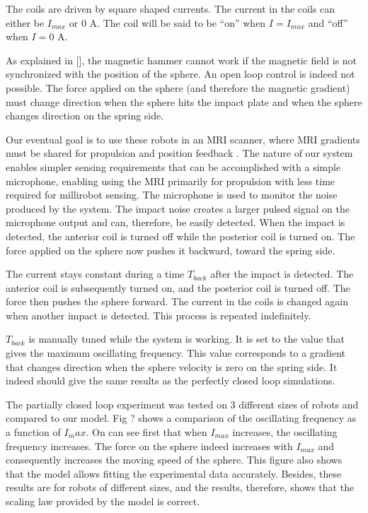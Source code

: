 \documentclass[letterpaper, 10 pt, conference]{ieeeconf}  %
\begin{document}
The coils are driven by square shaped currents. The current in the coils can either be $I_{max}$ or 0 A. The coil will be said to be “on” when $I=I_{max}$ and “off” when $I=0$ A.\par
As explained in [], the magnetic hammer cannot work if the magnetic field is not synchronized with the position of the sphere. An open loop control is indeed not possible. The force applied on the sphere (and therefore the magnetic gradient) must change direction when the sphere hits the impact plate and when the sphere changes direction on the spring side.\par
Our eventual goal is to use these robots in an MRI scanner, where MRI gradients must be shared for propulsion and position feedback \cite{578}. The nature of our system enables simpler sensing requirements that can be accomplished with a simple microphone, enabling using the MRI primarily for propulsion with less time required for millirobot sensing. The microphone is used to monitor the noise produced by the system. The impact noise creates a larger pulsed signal on the microphone output and can, therefore, be easily detected. When the impact is detected, the anterior coil is turned off while the posterior coil is turned on. The force applied on the sphere now pushes it backward, toward the spring side.\par
The current stays constant during a time $T_{back}$ after the impact is detected. The anterior coil is subsequently turned on, and the posterior coil is turned off. The force then pushes the sphere forward. The current in the coils is changed again when another impact is detected. This process is repeated indefinitely.\par
$T_{back}$ is manually tuned while the system is working. It is set to the value that gives the maximum oscillating frequency. This value corresponds to a gradient that changes direction when the sphere velocity is zero on the spring side. It indeed should give the same results as the perfectly closed loop simulations.\par
The partially closed loop experiment was tested on 3 different sizes of robots and compared to our model. Fig ? shows a comparison of the oscillating frequency as a function of $I_max$. On can see first that when $I_{max}$ increases, the oscillating frequency increases. The force on the sphere indeed increases with $I_{max}$ and consequently increases the moving speed of the sphere.
This figure also shows that the model allows fitting the experimental data accurately. Besides, these results are for robots of different sizes, and the results, therefore, shows that the scaling law provided by the model is correct.
\end{document}
